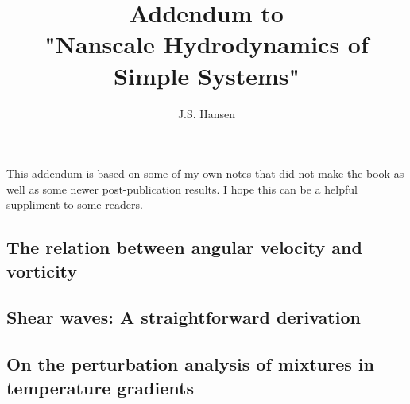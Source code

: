 \documentclass[11pt]{article}
\date{}
\author{J.S. Hansen}
\title{Addendum to \\ "Nanscale Hydrodynamics of Simple Systems"}
\begin{document}
\maketitle

This addendum is based on some of my own notes that did not make the book as well as some newer post-publication results. I hope this can 
be a helpful suppliment to some readers.

\subsection*{The relation between angular velocity and vorticity}
\subsection*{Shear waves: A straightforward derivation}
\subsection*{On the perturbation analysis of mixtures in temperature gradients}
\end{document}
